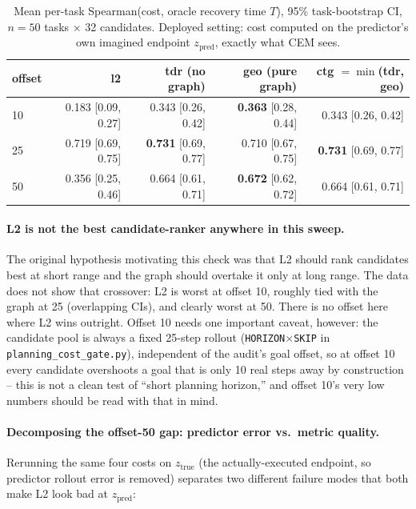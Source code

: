 \documentclass[11pt]{article}
\begin{document}
\begin{table}[H]
\centering\small
\caption{Mean per-task Spearman(cost, oracle recovery time $T$), 95\% task-bootstrap CI,
$n=50$ tasks $\times$ 32 candidates. Deployed setting: cost computed on the predictor's own
imagined endpoint $z_{\mathrm{pred}}$, exactly what CEM sees.}
\label{tab:graph-vs-l2-zpred}
\begin{tabular}{lrrrr}
\toprule
offset & l2 & tdr (no graph) & geo (pure graph) & ctg $=\min$(tdr, geo) \\
\midrule
10 & 0.183 [0.09, 0.27] & 0.343 [0.26, 0.42] & \textbf{0.363} [0.28, 0.44] & 0.343 [0.26, 0.42] \\
25 & 0.719 [0.69, 0.75] & \textbf{0.731} [0.69, 0.77] & 0.710 [0.67, 0.75] & \textbf{0.731} [0.69, 0.77] \\
50 & 0.356 [0.25, 0.46] & 0.664 [0.61, 0.71] & \textbf{0.672} [0.62, 0.72] & 0.664 [0.61, 0.71] \\
\bottomrule
\end{tabular}
\end{table}

\paragraph{L2 is not the best candidate-ranker anywhere in this sweep.} The original
hypothesis motivating this check was that L2 should rank candidates best at short range and
the graph should overtake it only at long range. The data does not show that crossover: L2
is worst at offset 10, roughly tied with the graph at 25 (overlapping CIs), and clearly worst
at 50. There is no offset here where L2 wins outright. Offset 10 needs one important caveat,
however: the candidate pool is always a fixed 25-step rollout
(\texttt{HORIZON}$\times$\texttt{SKIP} in \texttt{planning\_cost\_gate.py}), independent of
the audit's goal offset, so at offset 10 every candidate overshoots a goal that is only 10
real steps away by construction -- this is not a clean test of ``short planning horizon,'' and
offset 10's very low numbers should be read with that in mind.

\paragraph{Decomposing the offset-50 gap: predictor error vs.\ metric quality.} Rerunning the
same four costs on $z_{\mathrm{true}}$ (the actually-executed endpoint, so predictor rollout
error is removed) separates two different failure modes that both make L2 look bad at
$z_{\mathrm{pred}}$:
\end{document}
